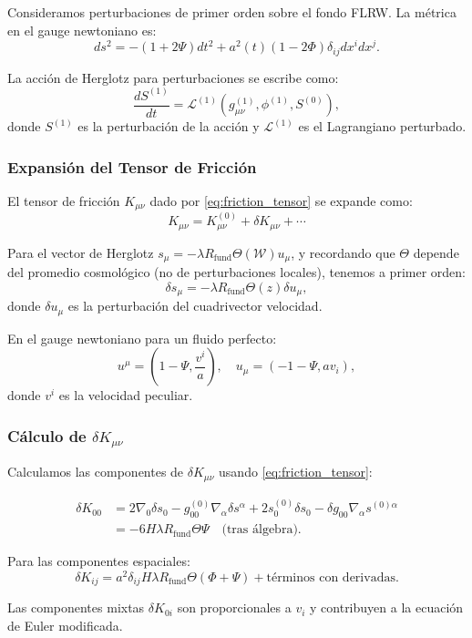 \documentclass[12pt, a4paper]{article}
\theoremstyle{plain}
\theoremstyle{definition}
\begin{document}
Consideramos perturbaciones de primer orden sobre el fondo FLRW. La métrica en el gauge newtoniano es:
\[
ds^2 = -(1 + 2\Psi) dt^2 + a^2(t)(1 - 2\Phi) \delta_{ij} dx^i dx^j.
\]

La acción de Herglotz para perturbaciones se escribe como:
\[
\frac{dS^{(1)}}{dt} = \mathcal{L}^{(1)}(g_{\mu\nu}^{(1)}, \phi^{(1)}, S^{(0)}),
\]
donde $S^{(1)}$ es la perturbación de la acción y $\mathcal{L}^{(1)}$ es el Lagrangiano perturbado.

\subsubsection{Expansión del Tensor de Fricción}

El tensor de fricción $K_{\mu\nu}$ dado por \eqref{eq:friction_tensor} se expande como:
\[
K_{\mu\nu} = K_{\mu\nu}^{(0)} + \delta K_{\mu\nu} + \cdots
\]

Para el vector de Herglotz $s_\mu = -\lambda R_{\text{fund}} \Theta(\mathcal{W}) u_\mu$, y recordando que $\Theta$ depende del promedio cosmológico (no de perturbaciones locales), tenemos a primer orden:
\[
\delta s_\mu = -\lambda R_{\text{fund}} \Theta(z) \delta u_\mu,
\]
donde $\delta u_\mu$ es la perturbación del cuadrivector velocidad.

En el gauge newtoniano para un fluido perfecto:
\[
u^\mu = \left(1 - \Psi, \frac{v^i}{a}\right), \quad u_\mu = \left(-1 - \Psi, a v_i\right),
\]
donde $v^i$ es la velocidad peculiar.

\subsubsection{Cálculo de $\delta K_{\mu\nu}$}

Calculamos las componentes de $\delta K_{\mu\nu}$ usando \eqref{eq:friction_tensor}:

\begin{align*}
\delta K_{00} &= 2\nabla_0 \delta s_0 - g_{00}^{(0)} \nabla_\alpha \delta s^\alpha + 2s_0^{(0)} \delta s_0 - \delta g_{00} \nabla_\alpha s^{(0)\alpha} \\
&= -6H \lambda R_{\text{fund}} \Theta \Psi \quad \text{(tras álgebra)}.
\end{align*}

Para las componentes espaciales:
\[
\delta K_{ij} = a^2 \delta_{ij} H \lambda R_{\text{fund}} \Theta \left( \Phi + \Psi \right) + \text{términos con derivadas}.
\]

Las componentes mixtas $\delta K_{0i}$ son proporcionales a $v_i$ y contribuyen a la ecuación de Euler modificada.
\end{document}
